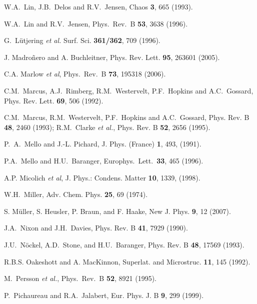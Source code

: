 \documentclass[a4paper,10pt]{article}
\begin{document}
\begin{thebibliography}{Cucc~02b}
W.A.~Lin, J.B.~Delos and R.V.~Jensen, Chaos {\bf 3}, 665 (1993).

W.A.~Lin and R.V.~Jensen, Phys.\ Rev.\ B 
{\bf 53}, 3638 (1996).

G.~L\"utjering {\em et al.} Surf. Sci. {\bf 361/362}, 709 (1996).

J. Madroñero and A. Buchleitner,
Phys. Rev. Lett. {\bf 95}, 263601 (2005).

C.A. Marlow {\it et al}, Phys.\ Rev.\ B  {\bf 73}, 195318 (2006).

 C.M.~Marcus, A.J.~Rimberg, R.M.~Westervelt, P.F.~Hopkins and A.C.~Gossard, Phys. Rev. Lett. {\bf 69}, 506 (1992).

 C.M.~Marcus, R.M.~Westervelt, P.F.~Hopkins
and A.C.~Gossard, Phys. Rev. B {\bf 48}, 2460 (1993); R.M.~Clarke
{\em et al.}, Phys. Rev. B {\bf 52}, 2656 (1995).

P.~A.~Mello and J.-L. Pichard, J. Phys. (France)
{\bf 1}, 493, (1991).

P.A.~Mello and  H.U.~Baranger, Europhys.~Lett.~{\bf 33}, 465 (1996).

A.P. Micolich {\it et al}, J. Phys.: Condens. Matter {\bf 10}, 1339, (1998).

W.H.~Miller, Adv. Chem. Phys. {\bf 25}, 69 (1974).

 S. M\"uller, S. Heusler,  P. Braun, and F. Haake, New J. Phys. {\bf 9}, 12 (2007).

J.A.~Nixon and J.H.~Davies, Phys. Rev. B {\bf 41},
7929 (1990).

J.U.~N\"ockel, A.D.~Stone, and H.U.~Baranger, 
Phys. Rev. B {\bf 48}, 17569 (1993).

R.B.S. Oakeshott and A. MacKinnon,
Superlat. and Microstruc. {\bf 11}, 145 (1992).

M.~Persson {\em et al.},  Phys.\ Rev.\ B {\bf 52}, 8921 (1995).

P.~Pichaureau and R.A.~Jalabert,
Eur. Phys. J. B {\bf 9}, 299 (1999).


\end{thebibliography}
\end{document}
